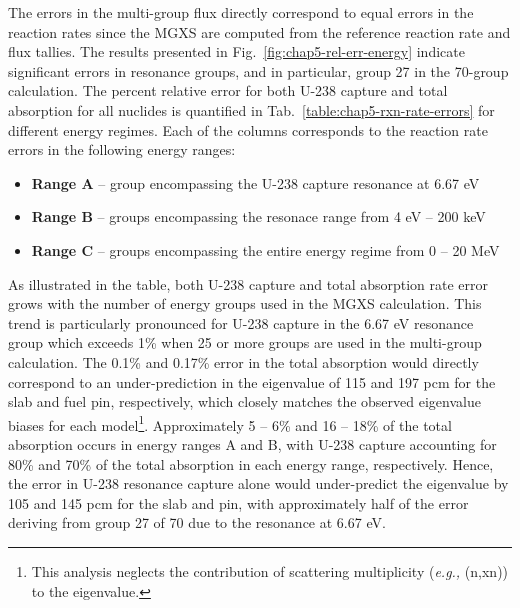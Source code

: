 The errors in the multi-group flux directly correspond to equal errors in the reaction rates since the \ac{MGXS} are computed from the reference reaction rate and flux tallies. The results presented in Fig.~\ref{fig:chap5-rel-err-energy} indicate significant errors in resonance groups, and in particular, group 27 in the 70-group calculation. The percent relative error for both U-238 capture and total absorption for all nuclides is quantified in Tab.~\ref{table:chap5-rxn-rate-errors} for different energy regimes. Each of the columns corresponds to the reaction rate errors in the following energy ranges:

\vspace{-0.1in}
\begin{itemize}[noitemsep]
  \item {\bf Range A} -- group encompassing the U-238 capture resonance at 6.67 eV
  \item {\bf Range B} -- groups encompassing the resonace range from 4 eV -- 200 keV
  \item {\bf Range C} -- groups encompassing the entire energy regime from 0 -- 20 MeV
\end{itemize}
\vspace{-0.1in}

As illustrated in the table, both U-238 capture and total absorption rate error grows with the number of energy groups used in the \ac{MGXS} calculation. This trend is particularly pronounced for U-238 capture in the 6.67 eV resonance group which exceeds 1\% when 25 or more groups are used in the multi-group calculation. The 0.1\% and 0.17\% error in the total absorption would directly correspond to an under-prediction in the eigenvalue of 115 and 197 \ac{pcm} for the slab and fuel pin, respectively, which closely matches the observed eigenvalue biases for each model\footnote{This analysis neglects the contribution of scattering multiplicity (\textit{e.g.,} (n,xn)) to the eigenvalue.}. Approximately 5 -- 6\% and 16 -- 18\% of the total absorption occurs in energy ranges A and B, with U-238 capture accounting for 80\% and 70\% of the total absorption in each energy range, respectively. Hence, the error in U-238 resonance capture alone would under-predict the eigenvalue by 105 and 145 \ac{pcm} for the slab and pin, with approximately half of the error deriving from group 27 of 70 due to the resonance at 6.67 eV. 



